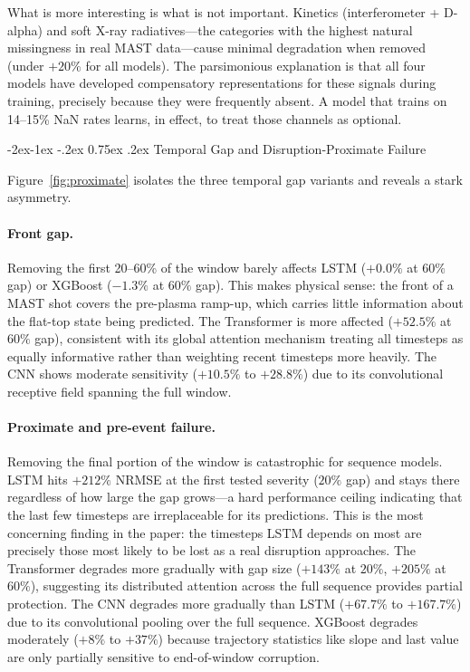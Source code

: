 \documentclass[10pt,twocolumn]{article}
\makeatletter
\renewcommand\subsection{\@startsection{subsection}{2}{\z@}%
  {-2ex\@plus -1ex \@minus -.2ex}%
  {0.75ex \@plus .2ex}%
  {\normalfont\large\bfseries}}
\makeatother
\begin{document}
What is more interesting is what is not important. Kinetics (interferometer
+ D-alpha) and soft X-ray radiatives—the categories with the highest
natural missingness in real MAST data—cause minimal degradation when
removed (under $+20\%$ for all models). The parsimonious explanation is
that all four models have developed compensatory representations for
these signals during training, precisely because they were frequently
absent. A model that trains on 14--15\% NaN rates learns, in effect,
to treat those channels as optional.

\subsection{Temporal Gap and Disruption-Proximate Failure}

Figure~\ref{fig:proximate} isolates the three temporal gap variants and
reveals a stark asymmetry.

\paragraph{Front gap.}
Removing the first 20--60\% of the window barely affects LSTM ($+0.0\%$
at $60\%$ gap) or XGBoost ($-1.3\%$ at $60\%$ gap). This makes physical
sense: the front of a MAST shot covers the pre-plasma ramp-up, which
carries little information about the flat-top state being predicted. The
Transformer is more affected ($+52.5\%$ at $60\%$ gap), consistent with
its global attention mechanism treating all timesteps as equally
informative rather than weighting recent timesteps more heavily. The CNN
shows moderate sensitivity ($+10.5\%$ to $+28.8\%$) due to its
convolutional receptive field spanning the full window.

\paragraph{Proximate and pre-event failure.}
Removing the final portion of the window is catastrophic for sequence
models. LSTM hits $+212\%$ NRMSE at the first tested severity ($20\%$
gap) and stays there regardless of how large the gap grows—a hard
performance ceiling indicating that the last few timesteps are
irreplaceable for its predictions. This is the most concerning finding
in the paper: the timesteps LSTM depends on most are precisely those most
likely to be lost as a real disruption approaches. The Transformer
degrades more gradually with gap size ($+143\%$ at $20\%$, $+205\%$ at
$60\%$), suggesting its distributed attention across the full sequence
provides partial protection. The CNN degrades more gradually than LSTM
($+67.7\%$ to $+167.7\%$) due to its convolutional pooling over the
full sequence. XGBoost degrades moderately ($+8\%$ to $+37\%$) because
trajectory statistics like slope and last value are only partially
sensitive to end-of-window corruption.
\end{document}
